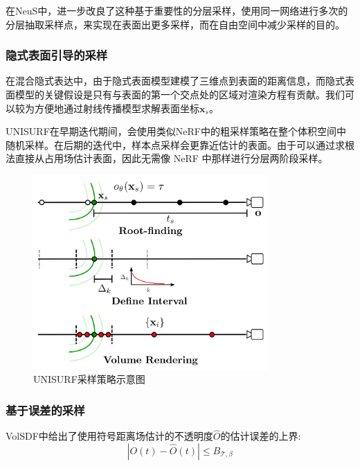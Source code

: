 在NeuS\cite{wang_neus_2021}中，进一步改良了这种基于重要性的分层采样，使用同一网络进行多次的分层抽取采样点，来实现在表面出更多采样，而在自由空间中减少采样的目的。


\subsubsection{隐式表面引导的采样}
在混合隐式表达中，由于隐式表面模型建模了三维点到表面的距离信息，而隐式表面模型的关键假设是只有与表面的第一个交点处的区域对渲染方程有贡献。我们可以较为方便地通过射线传播模型求解表面坐标$\mathbf{x}_s$\cite{niemeyer_differentiable_2020}。

UNISURF\cite{oechsle_unisurf_2021}在早期迭代期间，会使用类似NeRF中的粗采样策略在整个体积空间中随机采样。在后期的迭代中，样本点采样会更靠近估计的表面。由于可以通过求根法\cite{niemeyer_differentiable_2020}直接从占用场估计表面，因此无需像 NeRF 中那样进行分层两阶段采样。

\begin{figure}[h]
    \centering
    \includegraphics[width=0.8\textwidth]{undergraduate-thesis/images/unisurf-sampling.png}
    \caption{UNISURF\cite{oechsle_unisurf_2021}采样策略示意图}
    \label{fig:related-work unisurf-sampling}
\end{figure}

\subsubsection{基于误差的采样}
VolSDF\cite{yariv_volume_2021}中给出了使用符号距离场估计的不透明度$\hat{O}$的估计误差的上界:
\begin{equation}
    |O(t)-\hat{O}(t)|\leq B_{\mathcal{T},\beta}
\end{equation}


